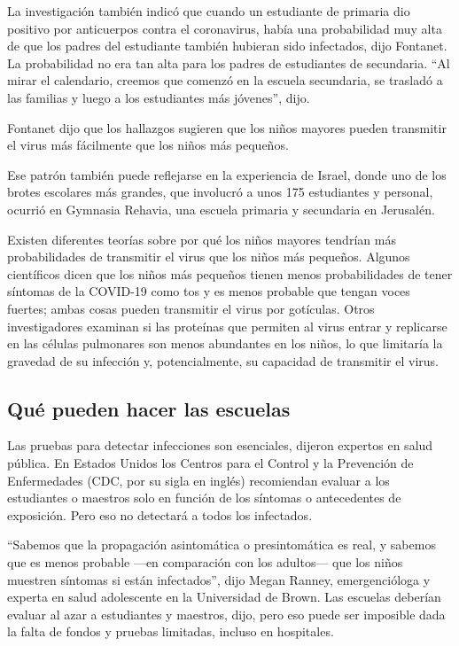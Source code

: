 La investigación también indicó que cuando un estudiante de primaria dio
positivo por anticuerpos contra el coronavirus, había una probabilidad
muy alta de que los padres del estudiante también hubieran sido
infectados, dijo Fontanet. La probabilidad no era tan alta para los
padres de estudiantes de secundaria. ``Al mirar el calendario, creemos
que comenzó en la escuela secundaria, se trasladó a las familias y luego
a los estudiantes más jóvenes'', dijo.

Fontanet dijo que los hallazgos sugieren que los niños mayores pueden
transmitir el virus más fácilmente que los niños más pequeños.

Ese patrón también puede reflejarse en la experiencia de Israel, donde
uno de los brotes escolares más grandes, que involucró a unos 175
estudiantes y personal, ocurrió en Gymnasia Rehavia, una escuela
primaria y secundaria en Jerusalén.

Existen diferentes teorías sobre por qué los niños mayores tendrían más
probabilidades de transmitir el virus que los niños más pequeños.
Algunos científicos dicen que los niños más pequeños tienen menos
probabilidades de tener síntomas de la COVID-19 como tos y es menos
probable que tengan voces fuertes; ambas cosas pueden transmitir el
virus por gotículas. Otros investigadores examinan si las proteínas que
permiten al virus entrar y replicarse en las células pulmonares son
menos abundantes en los niños, lo que limitaría la gravedad de su
infección y, potencialmente, su capacidad de transmitir el virus.

\hypertarget{quuxe9-pueden-hacer-las-escuelas}{%
\subsection{Qué pueden hacer las
escuelas}\label{quuxe9-pueden-hacer-las-escuelas}}

Las pruebas para detectar infecciones son esenciales, dijeron expertos
en salud pública. En Estados Unidos los Centros para el Control y la
Prevención de Enfermedades (CDC, por su sigla en inglés) recomiendan
evaluar a los estudiantes o maestros solo en función de los síntomas o
antecedentes de exposición. Pero eso no detectará a todos los
infectados.

``Sabemos que la propagación asintomática o presintomática es real, y
sabemos que es menos probable ---en comparación con los adultos--- que
los niños muestren síntomas si están infectados'', dijo Megan Ranney,
emergencióloga y experta en salud adolescente en la Universidad de
Brown. Las escuelas deberían evaluar al azar a estudiantes y maestros,
dijo, pero eso puede ser imposible dada la falta de fondos y pruebas
limitadas, incluso en hospitales.

